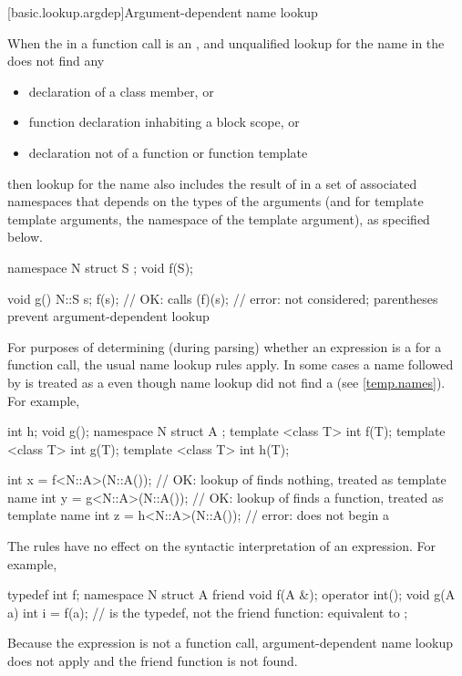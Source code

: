 [basic.lookup.argdep]{Argument-dependent name lookup}%

\pnum
When the  in
a function call is an ,
and unqualified lookup
for the name in the  does not find any
\begin{itemize}
\item
declaration of a class member, or
\item
function declaration inhabiting a block scope, or
\item
declaration not of a function or function template
\end{itemize}
then lookup for the name also includes the result of
 in a set of associated namespaces
that depends on the types of the arguments
(and for template template arguments, the namespace of the template argument),
as specified below.
\begin{example}
\begin{codeblock}
namespace N {
  struct S { };
  void f(S);
}

void g() {
  N::S s;
  f(s);             // OK: calls 
  (f)(s);           // error:  not considered; parentheses prevent argument-dependent lookup
}
\end{codeblock}
\end{example}

\pnum
\begin{note}
For purposes of determining
(during parsing) whether an expression is a
 for a function call, the usual name lookup
rules apply.
In some cases
a name followed by \tcode{<} is treated as a 
even though name lookup did not find a 
(see \ref{temp.names}).
For example,
\begin{codeblock}
int h;
void g();
namespace N {
  struct A {};
  template <class T> int f(T);
  template <class T> int g(T);
  template <class T> int h(T);
}

int x = f<N::A>(N::A());        // OK: lookup of  finds nothing,  treated as template name
int y = g<N::A>(N::A());        // OK: lookup of  finds a function,  treated as template name
int z = h<N::A>(N::A());        // error:  does not begin a 
\end{codeblock}

The rules have no effect on the syntactic interpretation of an expression.
For example,
\begin{codeblock}
typedef int f;
namespace N {
  struct A {
    friend void f(A &);
    operator int();
    void g(A a) {
      int i = f(a);             //  is the typedef, not the friend function: equivalent to 
    }
  };
}
\end{codeblock}
Because the expression is not a function call,
argument-dependent name lookup does not apply and
the friend function  is not found.
\end{note}

